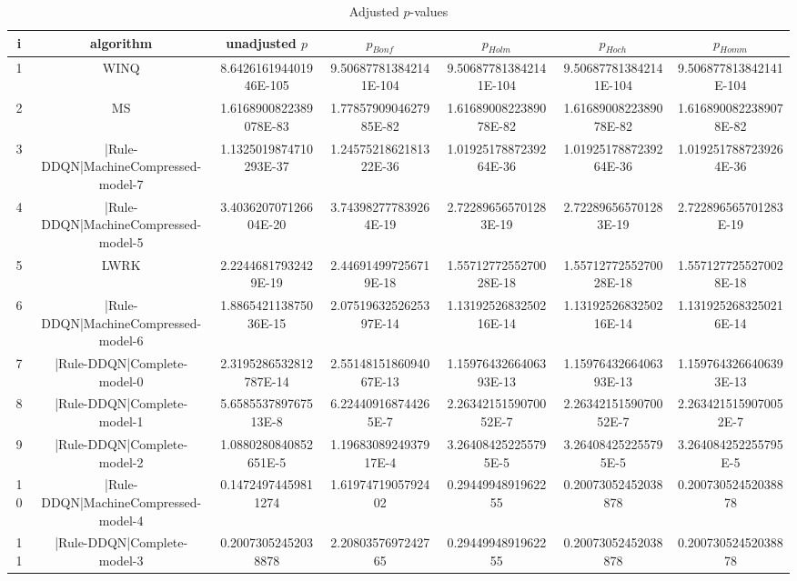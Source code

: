 \documentclass[a3paper,10pt]{article}
\begin{document}
\begin{table}[!htp]
\centering\tiny
\caption{Adjusted $p$-values}
\begin{tabular}{ccccccc}
i&algorithm&unadjusted $p$&$p_{Bonf}$&$p_{Holm}$&$p_{Hoch}$&$p_{Homm}$\\
\hline
1&WINQ&8.642616194401946E-105&9.506877813842141E-104&9.506877813842141E-104&9.506877813842141E-104&9.506877813842141E-104\\
2&MS&1.6168900822389078E-83&1.7785790904627985E-82&1.6168900822389078E-82&1.6168900822389078E-82&1.6168900822389078E-82\\
3&|Rule-DDQN|MachineCompressed-model-7&1.1325019874710293E-37&1.2457521862181322E-36&1.0192517887239264E-36&1.0192517887239264E-36&1.0192517887239264E-36\\
4&|Rule-DDQN|MachineCompressed-model-5&3.403620707126604E-20&3.743982777839264E-19&2.722896565701283E-19&2.722896565701283E-19&2.722896565701283E-19\\
5&LWRK&2.22446817932429E-19&2.446914997256719E-18&1.5571277255270028E-18&1.5571277255270028E-18&1.5571277255270028E-18\\
6&|Rule-DDQN|MachineCompressed-model-6&1.886542113875036E-15&2.0751963252625397E-14&1.1319252683250216E-14&1.1319252683250216E-14&1.1319252683250216E-14\\
7&|Rule-DDQN|Complete-model-0&2.3195286532812787E-14&2.5514815186094067E-13&1.1597643266406393E-13&1.1597643266406393E-13&1.1597643266406393E-13\\
8&|Rule-DDQN|Complete-model-1&5.658553789767513E-8&6.224409168744265E-7&2.2634215159070052E-7&2.2634215159070052E-7&2.2634215159070052E-7\\
9&|Rule-DDQN|Complete-model-2&1.0880280840852651E-5&1.1968308924937917E-4&3.264084252255795E-5&3.264084252255795E-5&3.264084252255795E-5\\
10&|Rule-DDQN|MachineCompressed-model-4&0.14724974459811274&1.6197471905792402&0.2944994891962255&0.20073052452038878&0.20073052452038878\\
11&|Rule-DDQN|Complete-model-3&0.20073052452038878&2.2080357697242765&0.2944994891962255&0.20073052452038878&0.20073052452038878\\
\hline
\end{tabular}
\end{table}
\end{document}
